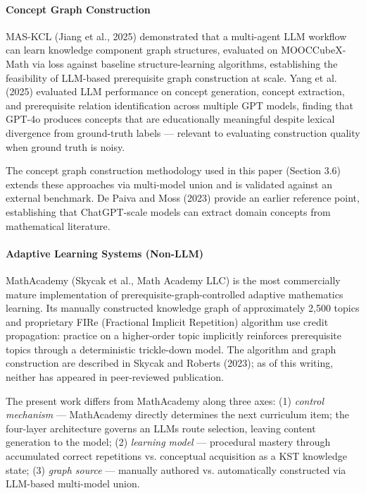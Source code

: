 \documentclass[
]{article}
\begin{document}
\paragraph{Concept Graph Construction}\label{concept-graph-construction}

MAS-KCL (Jiang et al., 2025) demonstrated that a multi-agent LLM workflow can learn knowledge component graph structures, evaluated on MOOCCubeX-Math via loss against baseline structure-learning algorithms, establishing the feasibility of LLM-based prerequisite graph construction at scale. Yang et al. (2025) evaluated LLM performance on concept generation, concept extraction, and prerequisite relation identification across multiple GPT models, finding that GPT-4o produces concepts that are educationally meaningful despite lexical divergence from ground-truth labels --- relevant to evaluating construction quality when ground truth is noisy.

The concept graph construction methodology used in this paper (Section 3.6) extends these approaches via multi-model union and is validated against an external benchmark. De Paiva and Moss (2023) provide an earlier reference point, establishing that ChatGPT-scale models can extract domain concepts from mathematical literature.

\paragraph{Adaptive Learning Systems (Non-LLM)}\label{adaptive-learning-systems-non-llm}

MathAcademy (Skycak et al., Math Academy LLC) is the most commercially mature implementation of prerequisite-graph-controlled adaptive mathematics learning. Its manually constructed knowledge graph of approximately 2,500 topics and proprietary FIRe (Fractional Implicit Repetition) algorithm use credit propagation: practice on a higher-order topic implicitly reinforces prerequisite topics through a deterministic trickle-down model. The algorithm and graph construction are described in Skycak and Roberts (2023); as of this writing, neither has appeared in peer-reviewed publication.

The present work differs from MathAcademy along three axes: (1) \emph{control mechanism} --- MathAcademy directly determines the next curriculum item; the four-layer architecture governs an LLM\textquotesingle s route selection, leaving content generation to the model; (2) \emph{learning model} --- procedural mastery through accumulated correct repetitions vs. conceptual acquisition as a KST knowledge state; (3) \emph{graph source} --- manually authored vs. automatically constructed via LLM-based multi-model union.
\end{document}
